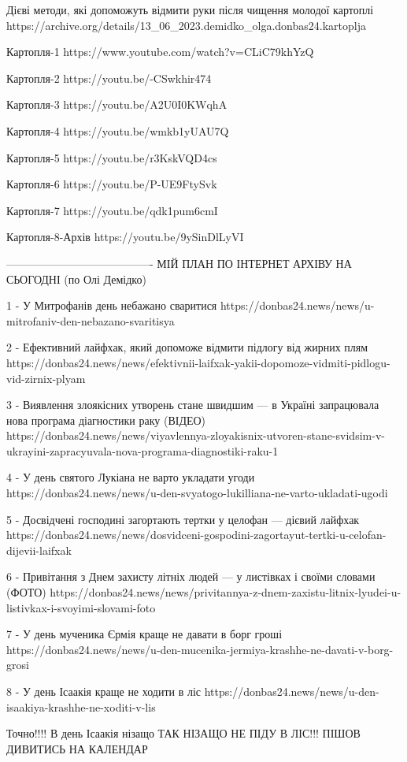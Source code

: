  
 
 
 
 

Дієві методи, які допоможуть відмити руки після чищення молодої картоплі
https://archive.org/details/13_06_2023.demidko_olga.donbas24.kartoplja

Картопля-1
https://www.youtube.com/watch?v=CLiC79khYzQ

Картопля-2
https://youtu.be/-CSwkhir474

Картопля-3
https://youtu.be/A2U0I0KWqhA

Картопля-4
https://youtu.be/wmkb1yUAU7Q

Картопля-5
https://youtu.be/r3KskVQD4cs

Картопля-6
https://youtu.be/P-UE9FtySvk

Картопля-7
https://youtu.be/qdk1pum6cmI

Картопля-8-Архів
https://youtu.be/9ySinDlLyVI

----------------------------------------
МІЙ ПЛАН ПО ІНТЕРНЕТ АРХІВУ НА СЬОГОДНІ (по Олі Демідко)

1 - У Митрофанів день небажано сваритися 
https://donbas24.news/news/u-mitrofaniv-den-nebazano-svaritisya

2 - Ефективний лайфхак, який допоможе відмити підлогу від жирних плям
https://donbas24.news/news/efektivnii-laifxak-yakii-dopomoze-vidmiti-pidlogu-vid-zirnix-plyam

3 - Виявлення злоякісних утворень стане швидшим — в Україні запрацювала нова програма діагностики раку (ВІДЕО) 
https://donbas24.news/news/viyavlennya-zloyakisnix-utvoren-stane-svidsim-v-ukrayini-zapracyuvala-nova-programa-diagnostiki-raku-1

4 - У день святого Лукіана не варто укладати угоди
https://donbas24.news/news/u-den-svyatogo-lukilliana-ne-varto-ukladati-ugodi

5 - Досвідчені господині загортають тертки у целофан — дієвий лайфхак 
https://donbas24.news/news/dosvidceni-gospodini-zagortayut-tertki-u-celofan-dijevii-laifxak

6 - Привітання з Днем захисту літніх людей — у листівках і своїми словами (ФОТО)
https://donbas24.news/news/privitannya-z-dnem-zaxistu-litnix-lyudei-u-listivkax-i-svoyimi-slovami-foto

7 - У день мученика Єрмія краще не давати в борг гроші 
https://donbas24.news/news/u-den-mucenika-jermiya-krashhe-ne-davati-v-borg-grosi

8 - У день Ісаакія краще не ходити в ліс
https://donbas24.news/news/u-den-isaakiya-krashhe-ne-xoditi-v-lis

Точно!!!! В день Ісаакія нізащо ТАК НІЗАЩО НЕ ПІДУ В ЛІС!!! ПІШОВ ДИВИТИСЬ НА КАЛЕНДАР
